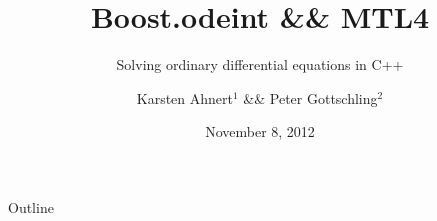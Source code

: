 \documentclass{beamer}
\title[Boost.odeint]{Boost.odeint \&\& MTL4}
\subtitle[odeint]{Solving ordinary differential equations in C++}
\author[Karsten Ahnert]{Karsten Ahnert$^1$ \&\& Peter Gottschling$^2$}
\institute[Ambrosys GmbH]{$^1$Ambrosys -- Gesellschaft f\"ur Management komplexer Systeme, Potsdam \vspace{1ex} \newline
 $^2$ SimuNova, Dresden}
\date{November 8, 2012}
\newcommand{\heading}[1]{\centerline{\Large #1} \vspace{0.5em}}
\begin{document}
\frame{
  \titlepage


}

\begin{frame}
  \heading{Outline}

  \tableofcontents
\end{frame}










% 

% 

% 


%
\end{document}
